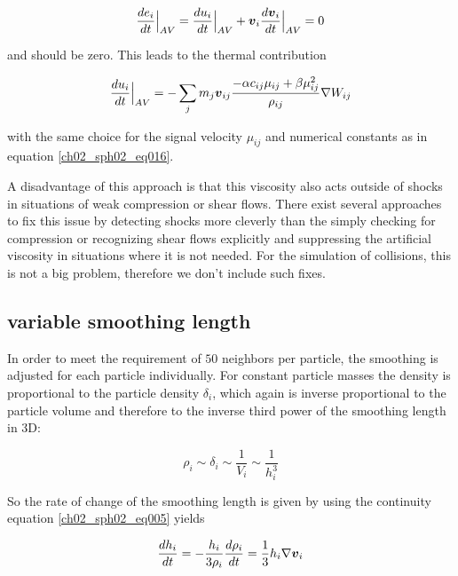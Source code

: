 \begin{equation}
\label{ch02_sph02_eq017}
\frac{de_i}{dt} \Big|_{AV}  = \frac{du_i}{dt}  \Big|_{AV} + \boldsymbol{v}_i \frac{d\boldsymbol{v}_i}{dt}  \Big|_{AV} = 0
\end{equation}

and should be zero. This leads to the thermal contribution

\begin{equation}
\label{ch02_sph02_eq018}
\frac{du_i }{dt} \Big|_{AV} = - \sum_{j} m_j \boldsymbol{v}_{ij} \frac{-\alpha c_{ij} \mu_{ij} + \beta \mu_{ij}^2}{\rho_{ij}} \nabla W_{ij}
\end{equation}

with the same choice for the signal velocity $\mu_{ij}$ and numerical constants as in equation \ref{ch02_sph02_eq016}. 

A disadvantage of this approach is that this viscosity also acts outside of shocks in situations of weak compression or shear flows. There exist several approaches to fix this issue by detecting shocks more cleverly \citep{Morris1997J.-Comput.-Phys.Morris} than the simply checking for compression or recognizing shear flows explicitly \citep{Balsara1995JCoPh.121..357B} and suppressing the artificial viscosity in situations where it is not needed. For the simulation of collisions, this is not a big problem, therefore we don't include such fixes.

\subsection{variable smoothing length}
In order to meet the requirement of $50$ neighbors per particle, the smoothing is adjusted for each particle individually. For constant particle masses the density is proportional to the particle density $\delta_i$, which again is inverse proportional to the particle volume and therefore to the inverse third power of the smoothing length in 3D:

\begin{equation}
\label{ch02_sph02_eq026}
\rho_i \sim \delta_i \sim \frac{1}{V_i} \sim \frac{1}{h_i^3}
\end{equation}

So the rate of change of the smoothing length is given by using the continuity equation \ref{ch02_sph02_eq005} yields

\begin{equation}
\label{ch02_sph02_eq027}
\frac{d h_i}{dt} = - \frac{h_i}{3 \rho_i} \frac{d \rho_i}{dt} = \frac{1}{3} h_i \nabla \boldsymbol{v}_i
\end{equation}

